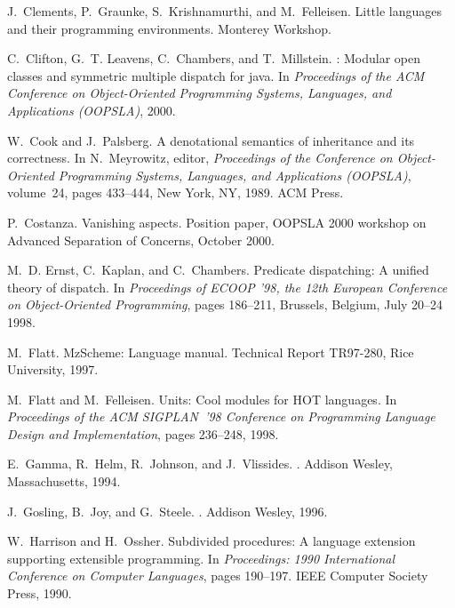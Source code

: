 \documentclass{acm_proc_article-sp}
\begin{document}
\begin{thebibliography}{10}
J.~Clements, P.~Graunke, S.~Krishnamurthi, and M.~Felleisen.
\newblock Little languages and their programming environments.
\newblock Monterey Workshop.

C.~Clifton, G.~T. Leavens, C.~Chambers, and T.~Millstein.
: Modular open classes and symmetric multiple dispatch for
  java.
\newblock In {\em Proceedings of the ACM Conference on Object-Oriented
  Programming Systems, Languages, and Applications (OOPSLA)}, 2000.

W.~Cook and J.~Palsberg.
\newblock A denotational semantics of inheritance and its correctness.
\newblock In N.~Meyrowitz, editor, {\em Proceedings of the Conference on
  Object-Oriented Programming Systems, Languages, and Applications ({OOPSLA})},
  volume~24, pages 433--444, New York, NY, 1989. ACM Press.

P.~Costanza.
\newblock Vanishing aspects.
\newblock Position paper, OOPSLA 2000 workshop on Advanced Separation of
  Concerns, October 2000.

M.~D. Ernst, C.~Kaplan, and C.~Chambers.
\newblock Predicate dispatching: {A} unified theory of dispatch.
\newblock In {\em Proceedings of ECOOP '98, the 12th European Conference on
  Object-Oriented Programming}, pages 186--211, Brussels, Belgium, July 20--24
  1998.

M.~Flatt.
 {MzScheme}: Language manual.
\newblock Technical Report TR97-280, Rice University, 1997.

M.~Flatt and M.~Felleisen.
\newblock Units: Cool modules for {HOT} languages.
\newblock In {\em Proceedings of the {ACM} {SIGPLAN}~'98 Conference on
  Programming Language Design and Implementation}, pages 236--248, 1998.

E.~Gamma, R.~Helm, R.~Johnson, and J.~Vlissides.
.
\newblock Addison Wesley, Massachusetts, 1994.

J.~Gosling, B.~Joy, and G.~Steele.
.
\newblock Addison Wesley, 1996.

W.~Harrison and H.~Ossher.
\newblock Subdivided procedures: {A} language extension supporting extensible
  programming.
\newblock In {\em Proceedings: 1990 International Conference on Computer
  Languages}, pages 190--197. IEEE Computer Society Press, 1990.


\end{thebibliography}
\end{document}
